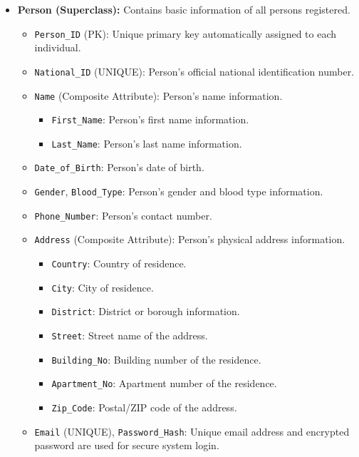 \documentclass[12pt,a4paper]{article}
\begin{document}
\begin{itemize}[label=\textbf{--}]


	\item \textbf{Person (Superclass):} Contains basic information of all persons registered.
	      \begin{itemize}[label=$\bullet$]
		      \item \texttt{Person\_ID} (PK): Unique primary key automatically assigned to each individual.
		      \item \texttt{National\_ID} (UNIQUE): Person's official national identification number.
		      \item \texttt{Name} (Composite Attribute): Person's name information.
		            \begin{itemize}[label=$\circ$]
			            \item \texttt{First\_Name}: Person's first name information.
			            \item \texttt{Last\_Name}: Person's last name information.
		            \end{itemize}
		      \item \texttt{Date\_of\_Birth}: Person's date of birth.
		      \item \texttt{Gender}, \texttt{Blood\_Type}: Person's gender and blood type information.
		      \item \texttt{Phone\_Number}: Person's contact number.
		      \item \texttt{Address} (Composite Attribute): Person's physical address information.
		            \begin{itemize}[label=$\circ$]
			            \item \texttt{Country}: Country of residence.
			            \item \texttt{City}: City of residence.
			            \item \texttt{District}: District or borough information.
			            \item \texttt{Street}: Street name of the address.
			            \item \texttt{Building\_No}: Building number of the residence.
			            \item \texttt{Apartment\_No}: Apartment number of the residence.
			            \item \texttt{Zip\_Code}: Postal/ZIP code of the address.
		            \end{itemize}
		      \item \texttt{Email} (UNIQUE), \texttt{Password\_Hash}: Unique email address and encrypted password are used for secure system login.
	      \end{itemize}


\end{itemize}
\end{document}
